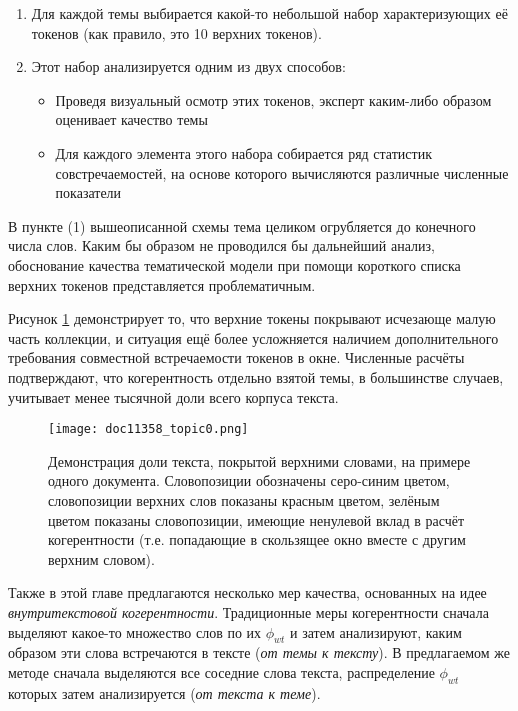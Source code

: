 \begin{enumerate}
    \item Для каждой темы выбирается какой-то небольшой набор характеризующих её токенов (как правило, это 10 верхних токенов).
    \item{Этот набор анализируется одним из двух способов:
    \begin{itemize}
        \item Проведя визуальный осмотр этих токенов, эксперт каким-либо образом оценивает качество темы
        \item Для каждого элемента этого набора собирается ряд статистик совстречаемостей, на основе которого вычисляются различные численные показатели
    \end{itemize}
    }
\end{enumerate}

В пункте (1) вышеописанной схемы тема целиком огрубляется до конечного числа слов. Каким бы образом не проводился бы дальнейший анализ, обоснование качества тематической модели
при помощи короткого списка верхних токенов представляется проблематичным.

Рисунок \ref{fig:ch3_doc_compound_auto} демонстрирует то, что верхние токены покрывают исчезающе малую часть коллекции, и ситуация ещё более усложняется наличием дополнительного требования совместной встречаемости токенов в окне. Численные расчёты подтверждают, что когерентность отдельно взятой темы, в большинстве случаев, учитывает менее тысячной доли всего корпуса текста.

\begin{figure}
        \texttt{[image: doc11358\_topic0.png]} %
    \captionsetup{justification=raggedright,singlelinecheck=false,format=hang}
    \caption{Демонстрация доли текста, покрытой верхними словами, на примере одного документа. Словопозиции обозначены серо-синим цветом, словопозиции верхних слов показаны красным цветом, зелёным цветом показаны словопозиции, имеющие ненулевой вклад в расчёт когерентности (т.е. попадающие в скользящее окно вместе с другим верхним словом).}
\label{fig:ch3_doc_compound_auto}
\end{figure}

Также в этой главе предлагаются несколько мер качества, основанных на идее \textit{внутритекстовой когерентности}.
Традиционные меры когерентности сначала выделяют какое-то множество слов по их $\phi_{wt}$ и затем анализируют, каким образом эти слова встречаются в тексте (\emph{от темы к тексту}). В предлагаемом же методе сначала выделяются все соседние слова текста, распределение $\phi_{wt}$ которых затем анализируется (\emph{от текста к теме}).

